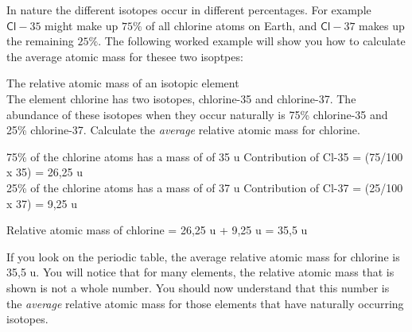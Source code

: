 
\label{m38753*id248557}In nature the different isotopes occur in different percentages. For example $\mathsf{Cl}-35$ might make up $75\%$ of all chlorine atoms on Earth, and $\mathsf{Cl}-37$ makes up the remaining $25\%$. The following worked example will show you how to calculate the average atomic mass for thesee two isoptpes: \par 
      
\begin{wex}{The relative atomic mass of an isotopic element\\}{
The element chlorine has two isotopes, chlorine-35 and chlorine-37. The abundance of these isotopes when they occur naturally is 75\% chlorine-35 and 25\% chlorine-37. Calculate the \textit{average} relative atomic mass for chlorine.\\
}

{
75\% of the chlorine atoms has a mass of of 35 u
Contribution of Cl-35 = (75/100 x 35) = 26,25 u\\
}
{
25\% of the chlorine atoms has a mass of of 37 u
Contribution of Cl-37 = (25/100 x 37) = 9,25 u\\
}

{

Relative atomic mass of chlorine = 26,25 u + 9,25 u = 35,5 u \\
}
\end{wex}
If you look on the periodic table, the average relative atomic mass for chlorine is 35,5 u. You will notice that for many elements, the relative atomic mass that is shown is not a whole number. You should now understand that this number is the \textit{average} relative atomic mass for those elements that have naturally occurring isotopes. \par

